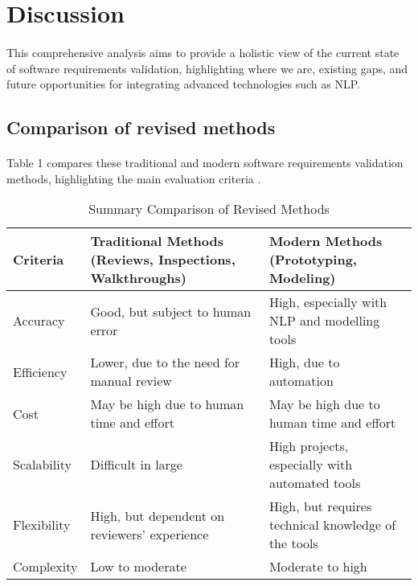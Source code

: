 \section{Discussion}
\paragraph{}
\sloppy
This comprehensive analysis aims to provide a holistic view of the current state of software requirements validation, highlighting where we are, existing gaps, and future opportunities for integrating advanced technologies such as NLP.
\subsection{Comparison of revised methods}
\paragraph{}
Table 1 compares these traditional and modern software requirements validation methods, highlighting the main evaluation criteria \cite{Wiegers2013, Pohl2015,freeth2012nlp, Anas2016,davis2013mastering}.
\begin{longtable}[htbp]{|p{2.5cm}|p{4.5cm}|p{4.5cm}|}
\caption{Summary Comparison of Revised Methods}\\
\hline
\textbf{Criteria} & \textbf{Traditional Methods} \newline (Reviews, Inspections, Walkthroughs) & \textbf{Modern Methods} \newline (Prototyping, Modeling) \\
\hline
\endfirsthead
\hline
\endfoot
\hline
\endlastfoot
Accuracy & Good, but subject to human error & High, especially with NLP and modelling tools\\
\hline
Efficiency & Lower, due to the need for manual review & High, due to automation\\
\hline
Cost & May be high due to human time and effort & May be high due to human time and effort \\
\hline
Scalability & Difficult in large & High projects, especially with automated tools\\
\hline
Flexibility & High, but dependent on reviewers' experience & High, but requires technical knowledge of the tools\\
\hline
Complexity & Low to moderate & Moderate to high
\end{longtable}

